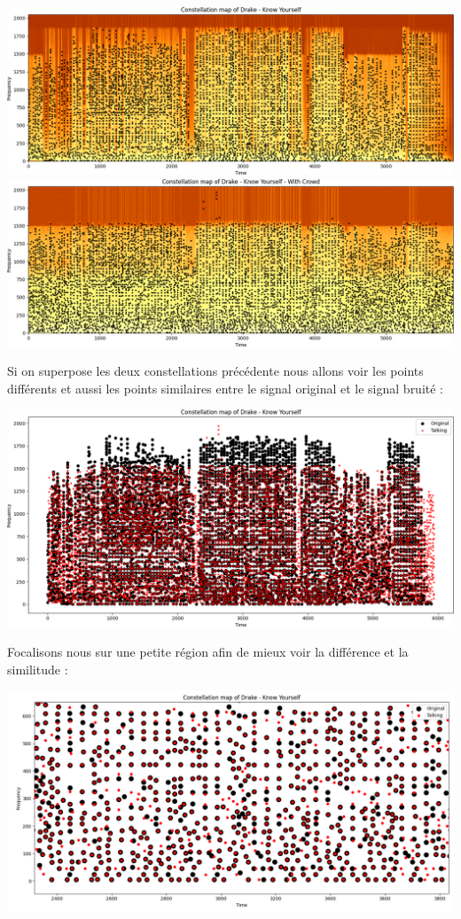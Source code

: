 \documentclass[11pt, report, french]{scrreprt}
\begin{document}
\begin{center}
	\includegraphics[scale=0.5]{img/constallation_drake.png}\vspace{1cm}
	\includegraphics[scale=0.5]{img/peaks_drake_crowd.png}
\end{center}

\newpage
Si on superpose les deux constellations précédente nous allons voir les points différents et aussi les points similaires entre le signal original et le signal bruité :

\begin{center}
	\includegraphics[scale=0.5]{img/similitude_drake_crowd.png}
\end{center}

Focalisons nous sur une petite région afin de mieux voir la différence et la similitude :

\begin{center}
	\includegraphics[scale=0.5]{img/similitude_drake_crowd_zoom.png}
\end{center}
\end{document}
